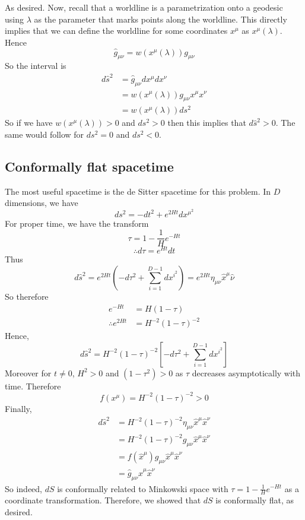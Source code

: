 \documentclass{article}
\begin{document}
			As desired. Now, recall that a worldline is a parametrization onto a geodesic using $\lambda$ as the parameter that marks points along the worldline. This directly implies that we can define the worldline for some coordinates $x^\mu$ as $x^\mu (\lambda)$. Hence
			$$ \hat g_{\mu\nu} = w \left( x^\mu \left( \lambda\right)\right) g_{\mu\nu}$$
			So the interval is
			\begin{align*}
				d\hat s^2 &= \hat g_{\mu\nu} dx^\mu dx^\nu \\
				&= w \left( x^\mu \left( \lambda\right)\right) g_{\mu\nu} x^\mu x^\nu \\
				&= w \left( x^\mu \left( \lambda\right)\right) ds^2
			\end{align*}
			So if we have $	w \left( x^\mu \left( \lambda\right)\right) > 0$ and $ds^2 > 0$ then this implies that $d\hat s^2 >0$. The same would follow for $ds^2 = 0$ and $ds^2 < 0$.
			
		\pagebreak
		\subsection{Conformally flat spacetime}
			The most useful spacetime is the de Sitter spacetime for this problem. In $D$ dimensions, we have
			$$ ds^2 = -dt^2 + e^{2Ht} dx^{\mu^2}$$
			For proper time, we have the transform
			$$ \tau = 1 - \frac{1}{H} e^{-Ht}$$
			$$ \therefore d\tau = e^{Ht}dt$$
			Thus
			$$ d\hat s^2 = e^{2Ht} \left( -d\tau^2 + \sum_{i=1}^{D-1} dx^{i^2} \right) = e^{2Ht} \eta_{\mu\nu} \hat{x}^\mu \hat{\nu}$$
			So therefore
			\begin{align*}
				e^{-Ht} &= H(1-\tau) \\
				\therefore e^{2Ht} &= H^{-2} (1-\tau)^{-2}
			\end{align*}
			Hence,
			$$ d \hat s ^2 = H^{-2}(1-\tau)^{-2} \left[ -d\tau^2 + \sum_{i=1}^{D-1} dx^{i^2} \right]$$
			Moreover for $t\neq0$, $H^2 > 0$ and $ (1-\tau^2)> 0$ as $\tau$ decreases asymptotically with time. Therefore
			$$ f(x^\mu) = H^{-2} (1-\tau)^{-2} >0$$
			Finally,
			\begin{align*}
				d\hat s^2 &= H^{-2} (1-\tau)^{-2} \eta_{\mu\nu} \hat{x}^\mu \hat x^\nu \\
				&= H^{-2} (1-\tau)^{-2} g_{\mu\nu} \hat x^\mu \hat x^\nu \\
				&= f\left(\hat x ^\mu \right) g_{\mu\nu} \hat x^\mu \hat x^\nu \\
				&= \hat g_{\mu\nu} \hat x^\mu \hat x^\nu
			\end{align*}
			So indeed, $dS$ is conformally related to Minkowski space with $\tau = 1 - \frac{1}{H}e^{-Ht}$ as a coordinate transformation. Therefore, we showed that $dS$ is conformally flat, as desired.
\end{document}
